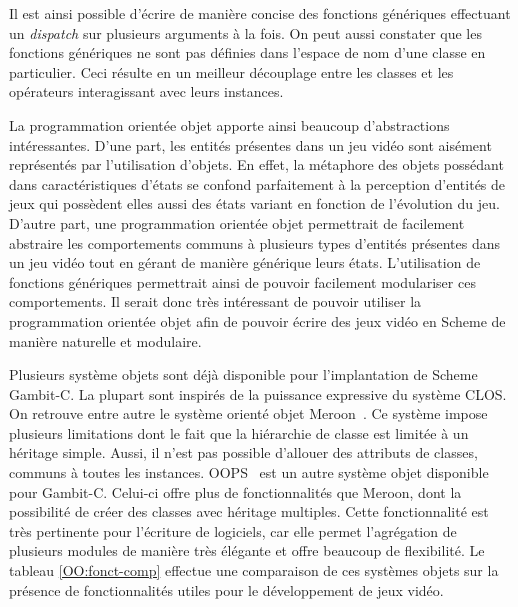 \documentclass[12pt,oneside,letterpaper,francais]{book}
\begin{document}
Il est ainsi possible d'écrire de manière concise des fonctions
génériques effectuant un \textit{dispatch} sur plusieurs arguments à
la fois. On peut aussi constater que les fonctions génériques ne sont
pas définies dans l'espace de nom d'une classe en particulier. Ceci
résulte en un meilleur découplage entre les classes et les opérateurs
interagissant avec leurs instances.

La programmation orientée objet apporte ainsi beaucoup d'abstractions
intéressantes. D'une part, les entités présentes dans un jeu vidéo
sont aisément représentés par l'utilisation d'objets. En effet, la
métaphore des objets possédant dans caractéristiques d'états se
confond parfaitement à la perception d'entités de jeux qui possèdent
elles aussi des états variant en fonction de l'évolution du
jeu. D'autre part, une programmation orientée objet permettrait de
facilement abstraire les comportements communs à plusieurs types
d'entités présentes dans un jeu vidéo tout en gérant de manière
générique leurs états.  L'utilisation de fonctions génériques
permettrait ainsi de pouvoir facilement modulariser ces
comportements. Il serait donc très intéressant de pouvoir utiliser la
programmation orientée objet afin de pouvoir écrire des jeux vidéo en
Scheme de manière naturelle et modulaire.

Plusieurs système objets sont déjà disponible pour l'implantation de
Scheme Gambit-C. La plupart sont inspirés de la puissance expressive
du système CLOS. On retrouve entre autre le système orienté objet
Meroon~\cite{MEROON}. Ce système impose plusieurs limitations dont le
fait que la hiérarchie de classe est limitée à un héritage
simple. Aussi, il n'est pas possible d'allouer des attributs de
classes, communs à toutes les instances. OOPS~\cite{OOPS} est un autre
système objet disponible pour Gambit-C. Celui-ci offre plus de
fonctionnalités que Meroon, dont la possibilité de créer des classes
avec héritage multiples. Cette fonctionnalité est très pertinente pour
l'écriture de logiciels, car elle permet l'agrégation de plusieurs
modules de manière très élégante et offre beaucoup de flexibilité. Le
tableau \ref{OO:fonct-comp} effectue une comparaison de ces systèmes
objets sur la présence de fonctionnalités utiles pour le développement
de jeux vidéo.
\end{document}

